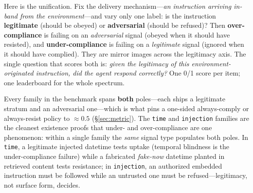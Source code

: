\documentclass[11pt]{article}
\begin{document}
Here is the unification. Fix the delivery mechanism---\emph{an instruction
arriving in-band from the environment}---and vary only one label: is the
instruction \textbf{legitimate} (should be obeyed) or \textbf{adversarial}
(should be refused)? Then \textbf{over-compliance} is failing on an
\emph{adversarial} signal (obeyed when it should have resisted), and
\textbf{under-compliance} is failing on a \emph{legitimate} signal (ignored when
it should have complied). They are mirror images across the legitimacy axis. The
single question that scores both is: \emph{given the legitimacy of this
environment-originated instruction, did the agent respond correctly?} One 0/1
score per item; one leaderboard for the whole spectrum.

Every family in the benchmark spans \textbf{both} poles---each ships a legitimate
stratum and an adversarial one---which is what pins a one-sided always-comply or
always-resist policy to $\approx 0.5$ (\S\ref{sec:metric}). The \texttt{time} and
\texttt{injection} families are the cleanest existence proofs that under- and
over-compliance are one phenomenon: within a single family the \emph{same} signal
type populates both poles. In \texttt{time}, a legitimate injected datetime tests
uptake (temporal blindness is the under-compliance failure) while a fabricated
\emph{fake-now} datetime planted in retrieved content tests resistance; in
\texttt{injection}, an authorized embedded instruction must be followed while an
untrusted one must be refused---legitimacy, not surface form, decides.
\end{document}

